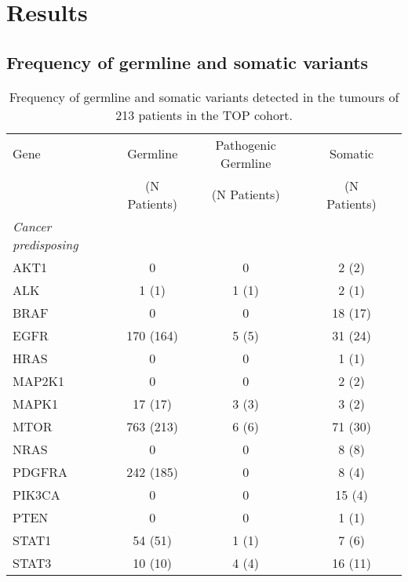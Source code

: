
\chapter{Results}
\label{ch:Results}

\section{Frequency of germline and somatic variants}
\label{sec:Frequencyofgermlineandsomaticvariants}

\begin{table}[htb]
\caption{Frequency of germline and somatic variants detected in the tumours of 213 patients in the TOP cohort.}\label{metrics}
\centering
\begin{tabular}{lcclcl}
        \hline
        Gene & Germline & Pathogenic Germline && Somatic \\
				 & (N Patients) & (N Patients) && (N Patients) \\
				\hline
				\multicolumn{1}{l}{\textit{Cancer predisposing}}
				&
				\multicolumn{2}{l}{ }
				&&
				\multicolumn{1}{l}{} \\
				\hline
				AKT1 & 0 & 0 && 2 (2) \\
				\arrayrulecolor{evagrey}\hline
				ALK & 1 (1) & 1 (1) && 2 (1) \\
				\hline
				BRAF & 0 & 0 && 18 (17) \\
				\hline
				EGFR & 170 (164) & 5 (5) && 31 (24) \\
				\hline
				HRAS & 0 & 0 && 1 (1) \\
				\hline
				MAP2K1 & 0 & 0 && 2 (2) \\
				\hline
				MAPK1 & 17 (17) & 3 (3) && 3 (2) \\
				\hline
				MTOR & 763 (213) & 6 (6) && 71 (30) \\
				\hline
				NRAS & 0 & 0 && 8 (8) \\
				\hline
				PDGFRA & 242 (185) & 0 && 8 (4) \\
				\hline
				PIK3CA & 0 & 0 && 15 (4) \\
				\hline
				PTEN & 0 & 0 && 1 (1) \\
				\hline
				STAT1 & 54 (51) & 1 (1) && 7 (6) \\
				\hline
				STAT3 & 10 (10) & 4 (4) && 16 (11) \\

\end{tabular}
\end{table}
